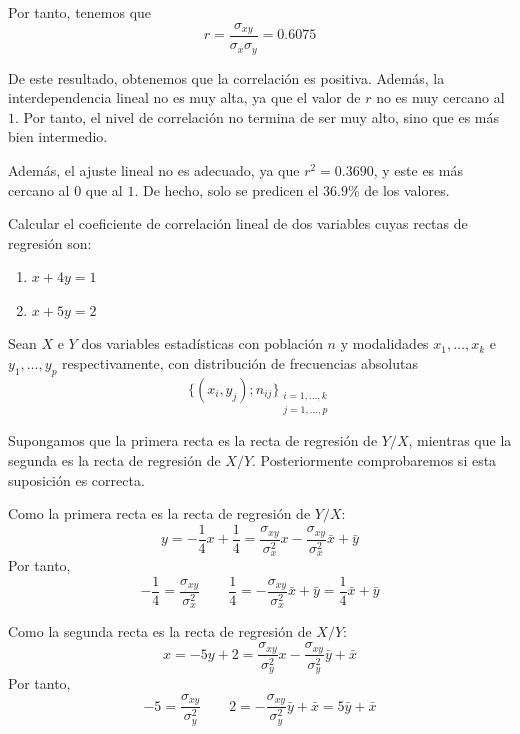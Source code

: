 \begin{ejercicio}
    Por tanto, tenemos que
    \begin{equation*}
        r = \frac{\sigma_{xy}}{\sigma_x \sigma_y} = 0.6075
    \end{equation*}

    De este resultado, obtenemos que la correlación es positiva. Además, la interdependencia lineal no es muy alta, ya que el valor de $r$ no es muy cercano al $1$. Por tanto, el nivel de correlación no termina de ser muy alto, sino que es más bien intermedio.
    
    Además, el ajuste lineal no es adecuado, ya que $r^2 = 0.3690$, y este es más cercano al $0$ que al $1$. De hecho, solo se predicen el $36.9\%$ de los valores.
\end{ejercicio}

\begin{ejercicio}
    Calcular el coeficiente de correlación lineal de dos variables cuyas rectas de regresión son:
    
    \begin{enumerate}
        \item $x+4y=1$
        \item $x+5y=2$
    \end{enumerate}

    Sean $X$ e $Y$ dos variables estadísticas con población $n$ y modalidades $x_1,\dots,x_k$ e $y_1,\dots,y_p$ respectivamente, con distribución de frecuencias absolutas
    $$\{(x_i,y_j);n_{ij}\}_{\substack{i=1,\dots,k\\j=1,\dots,p}}$$

    Supongamos que la primera recta es la recta de regresión de $Y/X$, mientras que la segunda es la recta de regresión de $X/Y$. Posteriormente comprobaremos si esta suposición es correcta.

    Como la primera recta es la recta de regresión de $Y/X$:
    \begin{equation*}
        y=-\frac{1}{4}x + \frac{1}{4} = \frac{\sigma_{xy}}{\sigma_x^2}x -\frac{\sigma_{xy}}{\sigma_x^2}\bar{x} + \bar{y}
    \end{equation*}
    Por tanto,
    \begin{equation*}
        -\frac{1}{4} = \frac{\sigma_{xy}}{\sigma_x^2} \qquad \frac{1}{4}=-\frac{\sigma_{xy}}{\sigma_x^2}\bar{x} + \bar{y} = \frac{1}{4}\bar{x} + \bar{y}
    \end{equation*}

    Como la segunda recta es la recta de regresión de $X/Y$:
    \begin{equation*}
        x=-5y+2 = \frac{\sigma_{xy}}{\sigma_y^2}x -\frac{\sigma_{xy}}{\sigma_y^2}\bar{y} + \bar{x}
    \end{equation*}
    Por tanto,
    \begin{equation*}
       -5 = \frac{\sigma_{xy}}{\sigma_y^2} \qquad 2=-\frac{\sigma_{xy}}{\sigma_y^2}\bar{y} + \bar{x} = 5\bar{y} + \bar{x}
    \end{equation*}


\end{ejercicio}
